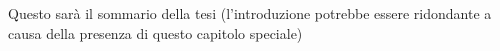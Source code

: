\sommario
Questo sarà il sommario della tesi (l'introduzione potrebbe essere ridondante a causa della presenza di questo capitolo speciale)